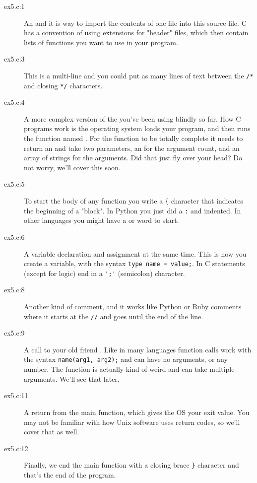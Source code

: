 \begin{description}
\item[ex5.c:1] An  and it is way to import the contents
    of one file into this source file.  C has a convention of using 
     extensions for "header" files, which then contain lists
    of functions you want to use in your program.
\item[ex5.c:3] This is a multi-line  and you could put as many
    lines of text between the \verb|/*| and closing \verb|*/| characters.
\item[ex5.c:4] A more complex version of the  you've
    been using blindly so far.  How C programs work is the operating system
    loads your program, and then runs the function named .
    For the function to be totally complete it needs to return an 
    and take two parameters, an  for the argument count, and
    an array of  strings for the arguments.  Did that
    just fly over your head?  Do not worry, we'll cover this soon.
\item[ex5.c:5] To start the body of any function you write a \verb|{| character
    that indicates the beginning of a "block".  In Python you just
    did a \verb|:| and indented. In other languages you might have a
     or  word to start.
\item[ex5.c:6] A variable declaration and assignment at the same time.
    This is how you create a variable, with the syntax \verb|type name = value;|.
    In C statements (except for logic) end in a \verb|';'| (semicolon) character.
\item[ex5.c:8] Another kind of comment, and it works like Python or
    Ruby comments where it starts at the \verb|//| and goes until the end of
    the line.
\item[ex5.c:9] A call to your old friend .  Like in many languages
    function calls work with the syntax \verb|name(arg1, arg2);| and can have
    no arguments, or any number.  The  function is actually
    kind of weird and can take multiple arguments. We'll see that later.
\item[ex5.c:11] A return from the main function, which gives the OS your exit
    value.  You may not be familiar with how Unix software uses return
    codes, so we'll cover that as well.
\item[ex5.c:12] Finally, we end the main function with a closing brace \verb|}|
    character and that's the end of the program.
\end{description}

